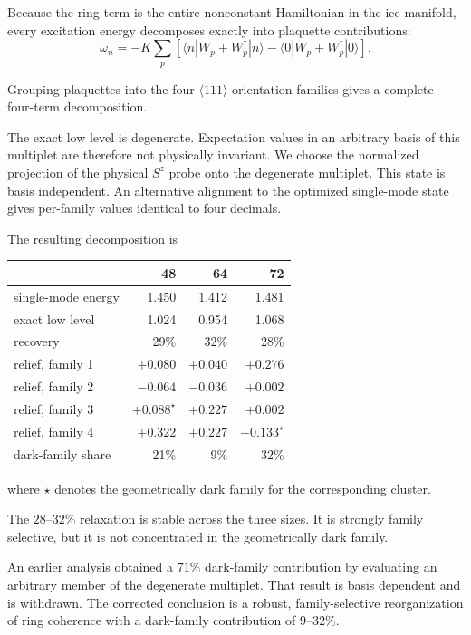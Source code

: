 \documentclass[
aps,
prl,
onecolumn,
amsmath,
amssymb,
superscriptaddress,
longbibliography
]{revtex4-2}
\begin{document}
Because the ring term is the entire nonconstant Hamiltonian in the
ice manifold, every excitation energy decomposes exactly into
plaquette contributions:
\begin{equation}
\omega_n
=
-K
\sum_p
\left[
\langle n|
W_p+W_p^\dagger
|n\rangle
-
\langle0|
W_p+W_p^\dagger
|0\rangle
\right].
\label{eq:edecomp}
\end{equation}

Grouping plaquettes into the four $\langle111\rangle$ orientation
families gives a complete four-term decomposition.

The exact low level is degenerate.
Expectation values in an arbitrary basis of this multiplet are
therefore not physically invariant.
We choose the normalized projection of the physical $S^z$ probe onto
the degenerate multiplet.
This state is basis independent.
An alternative alignment to the optimized single-mode state gives
per-family values identical to four decimals.

The resulting decomposition is
\begin{center}
\begin{tabular}{lrrr}
\hline\hline
&48&64&72\\
\hline
single-mode energy
&1.450&1.412&1.481\\
exact low level
&1.024&0.954&1.068\\
recovery
&29\%&32\%&28\%\\
\hline
relief, family 1
&$+0.080$&$+0.040$&$+0.276$\\
relief, family 2
&$-0.064$&$-0.036$&$+0.002$\\
relief, family 3
&$+0.088^\star$&$+0.227$&$+0.002$\\
relief, family 4
&$+0.322$&$+0.227$&$+0.133^\star$\\
\hline
dark-family share
&21\%&9\%&32\%\\
\hline\hline
\end{tabular}
\end{center}
where $\star$ denotes the geometrically dark family for the
corresponding cluster.

The $28$--$32\%$ relaxation is stable across the three sizes.
It is strongly family selective, but it is not concentrated in the
geometrically dark family.

An earlier analysis obtained a $71\%$ dark-family contribution by
evaluating an arbitrary member of the degenerate multiplet.
That result is basis dependent and is withdrawn.
The corrected conclusion is a robust, family-selective reorganization
of ring coherence with a dark-family contribution of $9$--$32\%$.
\end{document}
